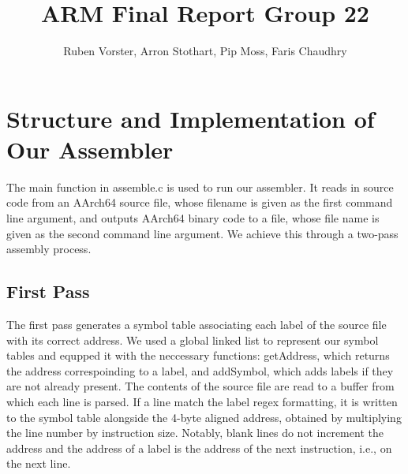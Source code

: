 \documentclass[11pt]{article}
\date{}
\begin{document}
\title{ARM Final Report Group 22}
\author{Ruben Vorster, Arron Stothart, Pip Moss, Faris Chaudhry}

\maketitle

\section{Structure and Implementation of Our Assembler}
The main function in assemble.c is used to run our assembler. It reads in source code from an AArch64 source file, whose filename is given as the first command line argument, and outputs AArch64 binary code to a file, whose file name is given as the second command line argument. We achieve this through a two-pass assembly process. 
\subsection{First Pass}
The first pass generates a symbol table associating each label of the source file with its correct address. We used a global linked list to represent our symbol tables and equpped it with the neccessary functions: getAddress, which returns the address correspoinding to a label, and addSymbol, which adds labels if they are not already present. The contents of the source file are read to a buffer from which each line is parsed. If a line match the label regex formatting, it is written to the symbol table alongside the 4-byte aligned address, obtained by multiplying the line number by instruction size. Notably, blank lines do not increment the address and the address of a label is the address of the next instruction, i.e., on the next line.  
\end{document}
